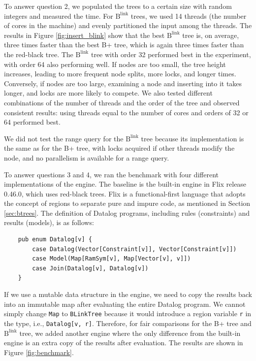 \documentclass[11pt]{report}
\theoremstyle{definition}
\begin{document}
To answer question 2, we populated the trees to a certain size with random integers and measured the time. For $\text{B}^{\text{link}}$ trees, we used 14 threads (the number of cores in the machine) and evenly partitioned the input among the threads. The results in Figure \ref{fig:insert_blink} show that the best $\text{B}^{\text{link}}$ tree is, on average, three times faster than the best B+ tree, which is again three times faster than the red-black tree. The $\text{B}^{\text{link}}$ tree with order 32 performed best in the experiment, with order 64 also performing well. If nodes are too small, the tree height increases, leading to more frequent node splits, more locks, and longer times. Conversely, if nodes are too large, examining a node and inserting into it takes longer, and locks are more likely to compete. We also tested different combinations of the number of threads and the order of the tree and observed consistent results: using threads equal to the number of cores and orders of 32 or 64 performed best.

We did not test the range query for the $\text{B}^{\text{link}}$ tree because its implementation is the same as for the B+ tree, with locks acquired if other threads modify the node, and no parallelism is available for a range query.

To answer questions 3 and 4, we ran the benchmark with four different implementations of the engine. The baseline is the built-in engine in Flix release 0.46.0, which uses red-black trees. Flix is a functional-first language that adopts the concept of regions to separate pure and impure code, as mentioned in Section \ref{sec:btrees}. The definition of Datalog programs, including rules (constraints) and results (models), is as follows:
\begin{verbatim}
    pub enum Datalog[v] {
        case Datalog(Vector[Constraint[v]], Vector[Constraint[v]])
        case Model(Map[RamSym[v], Map[Vector[v], v]])
        case Join(Datalog[v], Datalog[v])
    }
\end{verbatim}

If we use a mutable data structure in the engine, we need to copy the results back into an immutable map after evaluating the entire Datalog program. We cannot simply change \texttt{Map} to \texttt{BLinkTree} because it would introduce a region variable \texttt{r} in the type, i.e., \texttt{Datalog[v, r]}. Therefore, for fair comparisons for the B+ tree and $\text{B}^{\text{link}}$ tree, we added another engine where the only difference from the built-in engine is an extra copy of the results after evaluation. The results are shown in Figure \ref{fig:benchmark}.
\end{document}
